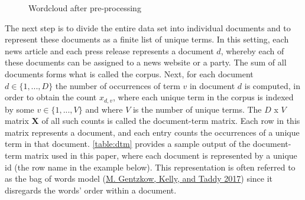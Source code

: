 \documentclass[
]{article}
\begin{document}
\begin{figure}

{\centering {}

}

\caption{Wordcloud after pre-processing \label{fig:wordclouds2}}\label{fig:wordclouds2}
\end{figure}

The next step is to divide the entire data set into individual documents
and to represent these documents as a finite list of unique terms. In
this setting, each news article and each press release represents a
document \(d\), whereby each of these documents can be assigned to a
news website or a party. The sum of all documents forms what is called
the corpus. Next, for each document \(d \in \lbrace 1,...,D \rbrace\)
the number of occurrences of term \(v\) in document \(d\) is computed,
in order to obtain the count \(x_{d,v}\), where each unique term in the
corpus is indexed by some \(v \in \lbrace 1,...,V \rbrace\) and where
\(V\) is the number of unique terms. The \(D\) x \(V\) matrix
\(\boldsymbol{X}\) of all such counts is called the document-term
matrix. Each row in this matrix represents a document, and each entry
counts the occurrences of a unique term in that document.
\autoref{table:dtm} provides a sample output of the document-term matrix
used in this paper, where each document is represented by a unique id
(the row name in the example below). This representation is often
referred to as the bag of words model
(\protect\hyperlink{ref-gentzkow_text_2017}{M. Gentzkow, Kelly, and
Taddy 2017}) since it disregards the words' order within a document.
\end{document}
